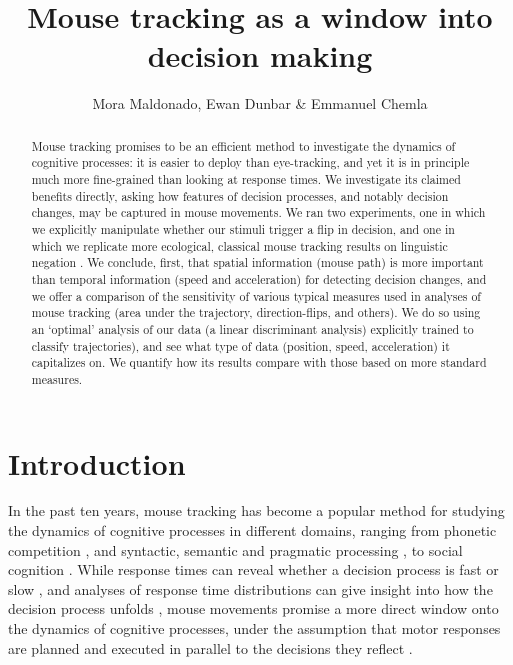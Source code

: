 \documentclass[11pt]{article}
\title{Mouse tracking as a window into decision making}
\author{Mora Maldonado, Ewan Dunbar \& Emmanuel Chemla}
\begin{document}
\maketitle

\begin{abstract}
Mouse tracking promises to be an efficient method to investigate the dynamics of cognitive processes: it is easier to deploy than eye-tracking, and yet it is in principle much more fine-grained than looking at response times.
We investigate its claimed benefits directly, asking how features of decision processes, and notably decision changes, may be captured in mouse movements. 
We ran two experiments, one in which we explicitly manipulate whether our stimuli trigger a flip in decision, and one in which we replicate more ecological, classical mouse tracking results on linguistic negation \citep{Dale2011}.
We conclude, first, that spatial information (mouse path) is more important than temporal information (speed and acceleration) for detecting decision changes, and we offer a comparison of the sensitivity of various typical measures used in analyses of mouse tracking (area under the trajectory, direction-flips, and others). We do so using an `optimal' analysis of our data (a linear discriminant analysis) explicitly trained to classify trajectories), and see what type of data (position, speed, acceleration) it capitalizes on. We quantify how its results compare with those based on more standard measures.

\end{abstract}




\section{Introduction}

In the past ten years, mouse tracking has become a popular method for studying the dynamics of cognitive processes in different domains, ranging from phonetic competition \citep{Spivey2005,cranford2017mouse}, and syntactic, semantic and pragmatic processing \citep[among others]{Farmer2007, Dale2011, tomlinson2013possibly,xiao2014semantic,sauerland2015tracking,xiao2017role}, to social cognition \citep{Freeman2010,Freeman2011,freeman2016more}.
While response times can reveal whether a decision process is fast or slow \citep{donders1969speed}, and analyses of response time distributions can give insight into how the decision process unfolds \citep[among others]{usher2001time,ratcliff2008diffusion}, mouse movements promise a more direct window onto the dynamics of cognitive processes, under the assumption that motor responses are planned and executed in parallel to the decisions they reflect \citep{song2006role,Song2009,Freeman2010,spivey2006continuous,Hehman2014}.
\end{document}
